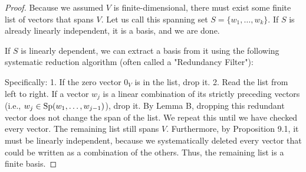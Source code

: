 \begin{proof}
Because we assumed $V$ is finite-dimensional, there must exist some finite list of vectors that spans $V$. Let us call this spanning set $S = \{w_1, \dots, w_k\}$. If $S$ is already linearly independent, it is a basis, and we are done.

If $S$ is linearly dependent, we can extract a basis from it using the following systematic reduction algorithm (often called a "Redundancy Filter"):

\begin{center}
\end{center}

Specifically:
1. If the zero vector $0_V$ is in the list, drop it.
2. Read the list from left to right. If a vector $w_j$ is a linear combination of its strictly preceding vectors (i.e., $w_j \in \operatorname{Sp}(w_1, \dots, w_{j-1})$), drop it. 
By Lemma B, dropping this redundant vector does not change the span of the list. We repeat this until we have checked every vector. The remaining list still spans $V$. Furthermore, by Proposition 9.1, it must be linearly independent, because we systematically deleted every vector that could be written as a combination of the others. Thus, the remaining list is a finite basis.
\end{proof}

